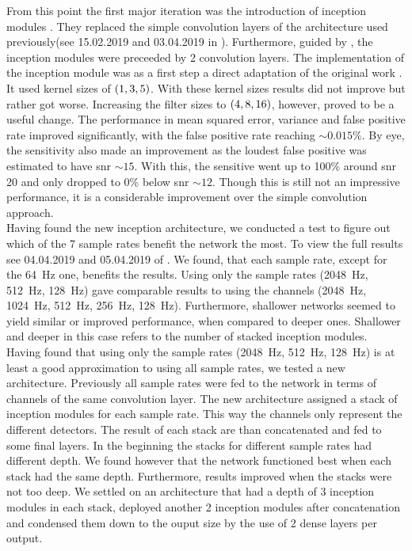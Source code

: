 From this point the first major iteration was the introduction of inception modules \cite{inception_module}. They replaced the simple convolution layers of the architecture used previously(see 15.02.2019 and 03.04.2019 in \cite{network_wiki}). Furthermore, guided by \cite{inception_module}, the inception modules were preceeded by 2 convolution layers. The implementation of the inception module was as a first step a direct adaptation of the original work \cite{inception_module}. It used kernel sizes of ${\left( 1,3,5 \right)}$. With these kernel sizes results did not improve but rather got worse. Increasing the filter sizes to ${\left( 4,8,16 \right)}$, however, proved to be a useful change. The performance in mean squared error, variance and false positive rate improved significantly, with the false positive rate reaching $\sim 0.015\%$. By eye, the sensitivity also made an improvement as the loudest false positive was estimated to have \gls{snr} $\sim 15$. With this, the sensitive went up to 100\% around \gls{snr} 20 and only dropped to 0\% below \gls{snr} $\sim 12$. Though this is still not an impressive performance, it is a considerable improvement over the simple convolution approach.\medskip\\
Having found the new inception architecture, we conducted a test to figure out which of the 7 sample rates benefit the network the most. To view the full results see 04.04.2019 and 05.04.2019 of \cite{network_wiki}. We found, that each sample rate, except for the \SI{64}{\hertz} one, benefits the results. Using only the sample rates (\SI{2048}{\hertz}, \SI{512}{\hertz}, \SI{128}{\hertz}) gave comparable results to using the channels (\SI{2048}{\hertz}, \SI{1024}{\hertz}, \SI{512}{\hertz}, \SI{256}{\hertz}, \SI{128}{\hertz}). Furthermore, shallower networks seemed to yield similar or improved performance, when compared to deeper ones. Shallower and deeper in this case refers to the number of stacked inception modules.\medskip\\
Having found that using only the sample rates (\SI{2048}{\hertz}, \SI{512}{\hertz}, \SI{128}{\hertz}) is at least a good approximation to using all sample rates, we tested a new architecture. Previously all sample rates were fed to the network in terms of channels of the same convolution layer. The new architecture assigned a stack of inception modules for each sample rate. This way the channels only represent the different detectors. The result of each stack are than concatenated and fed to some final layers. In the beginning the stacks for different sample rates had different depth. We found however that the network functioned best when each stack had the same depth. Furthermore, results improved when the stacks were not too deep. We settled on an architecture that had a depth of 3 inception modules in each stack, deployed another 2 inception modules after concatenation and condensed them down to the ouput size by the use of 2 dense layers per output.\\
